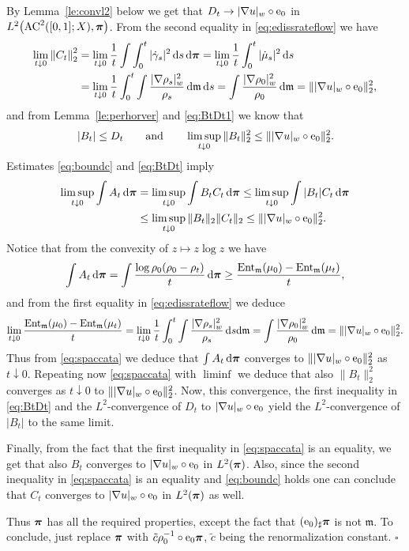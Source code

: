 \documentclass[reqno,11pt]{article}
\numberwithin{equation}{section}
\newcommand{\mm}{{\mbox{\boldmath$m$}}}
\newcommand{\ppi}{{\mbox{\boldmath$\pi$}}}
\renewcommand{\d}{{\mathrm d}}
\newenvironment{proof}{\removelastskip\par\medskip   %
\noindent{\em Proof.}
\rm}{\penalty-20\null\hfill$\square$\par\medbreak}
\newcommand{\e}{{\rm{e}}}                           %
\newcommand{\weakgrad}[1]{|\nabla #1|_w}                %
\newcommand{\entr}[2]{{\rm Ent}_{#2}(#1)}              %
\newcommand{\AC}[3]{\mathrm{AC}^{#1}(#2;#3)}
\renewcommand{\mm}{\mathfrak m}
\begin{document}
\begin{proof}
By Lemma~\ref{le:convl2} below we get that $D_t\to\weakgrad
u\circ\e_0$ in $L^2\bigl(\AC2{[0,1]}X ,\ppi\bigr)$. From the second
equality in \eqref{eq:edissrateflow} we have
\begin{equation}
\label{eq:boundc}
\begin{split}
\lim_{t\downarrow 0}\left\|C_t\right\|^2_2&= \lim_{t\downarrow
0}\frac1t\int\int_0^t|\dot\gamma_s|^2\,\d s\,\d\ppi
=\lim_{t\downarrow 0}\frac1t\int_0^t|\dot\mu_s|^2\,\d s\\
&=\lim_{t\downarrow 0}\frac1t
\int_0^t\int\frac{\weakgrad{\rho_s}^2}{\rho_s}\,\d\mm\,\d s
=\int\frac{\weakgrad{\rho_0}^2}{\rho_0}\,\d\mm=\|\weakgrad
u\circ\e_0\|^2_2,
\end{split}
\end{equation}
and from Lemma~\ref{le:perhorver} and \eqref{eq:BtDt1} we know that
\begin{equation}\label{eq:BtDt}
|B_t|\leq D_t\qquad\text{and}\qquad\limsup_{t\downarrow
0}\|B_t\|_2^2\leq\|\weakgrad u\circ\e_0\|^2_2.
\end{equation}
Estimates \eqref{eq:boundc} and \eqref{eq:BtDt} imply
\begin{equation}
\label{eq:spaccata}
\begin{split}
\limsup_{t\downarrow 0}\int A_t\,\d\ppi&=\limsup_{t\downarrow 0}
\int B_tC_t\,\d\ppi\leq\limsup_{t\downarrow 0}\int |B_t|C_t\,\d\ppi\\
&\leq\limsup_{t\downarrow 0}\|B_t\|_2\|C_t\|_2\leq\|\weakgrad
u\circ\e_0\|^2_2.
\end{split}
\end{equation}
Notice that from the convexity of $z\mapsto z\log z$ we have
\[
\int A_t\,\d\ppi=\int\frac{\log\rho_0(\rho_0-\rho_t)}t\,\d\ppi\geq
\frac{\entr{\mu_0}{\mm}-\entr{\mu_t}\mm}t,
\]
and from the first equality in \eqref{eq:edissrateflow} we deduce
\[
\lim_{t\downarrow 0} \frac{\entr{\mu_0}{\mm}-\entr{\mu_t}\mm}t=
\lim_{t\downarrow 0}\frac1t
\int_0^t\int\frac{\weakgrad{\rho_s}^2}{\rho_s}\,\d s\d\mm=
\int\frac{\weakgrad{\rho_0}^2}{\rho_0}\,\d\mm=\|\weakgrad
u\circ\e_0\|^2_2.
\]
Thus from \eqref{eq:spaccata} we deduce that $\int A_t\,\d\ppi$
converges to $\|\weakgrad u\circ\e_0\|^2_2$ as $t\downarrow 0$.
Repeating now \eqref{eq:spaccata} with $\liminf$ we deduce that also
$\|B_t\|^2_2$ converges as $t\downarrow 0$ to $\|\weakgrad
u\circ\e_0\|^2_2$. Now, this convergence, the first inequality in
\eqref{eq:BtDt} and the $L^2$-convergence of $D_t$ to $\weakgrad
u\circ \e_0$ yield the $L^2$-convergence of $|B_t|$ to the same
limit.

Finally, from the fact that the first inequality in
\eqref{eq:spaccata} is an equality, we get that also $B_t$ converges
to $\weakgrad u\circ\e_0$ in $L^2(\ppi)$. Also, since the second
inequality in \eqref{eq:spaccata} is an equality and
\eqref{eq:boundc} holds one can conclude that $C_t$ converges to
$\weakgrad u\circ\e_0$ in $L^2(\ppi)$ as well.

Thus $\ppi$ has all the required properties, except the fact that
$(\e_0)_\sharp\ppi$ is not $\mm$. To conclude, just replace $\ppi$
with $\tilde c\rho_0^{-1}\circ\e_0\ppi$, $\tilde c$ being the
renormalization constant.
\end{proof}
\end{document}
